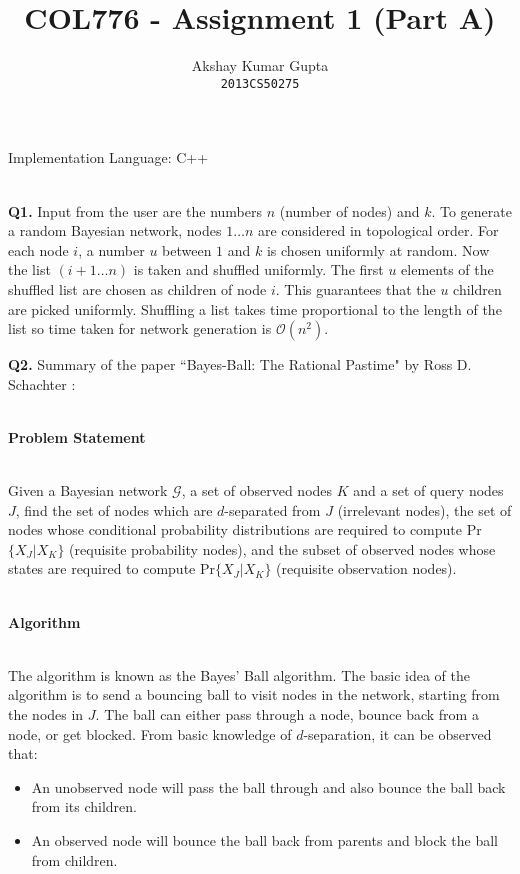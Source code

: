 \documentclass[]{article}
\begin{document}
\title{COL776 - Assignment 1 (Part A)}
\author{\Large Akshay Kumar Gupta\\ \texttt{2013CS50275}}
\date{}
\maketitle

{\noindent \large Implementation Language: C++}
\\ 
\\
\par \noindent
{{\bfseries Q1.}} Input from the user are the numbers $n$ (number of nodes) and $k$. To generate a random Bayesian network, nodes $1 \ldots n$ are considered in topological order. For each node $i$, a number $u$ between $1$ and $k$ is chosen uniformly at random. Now the list $(i+1 \ldots n)$ is taken and shuffled uniformly. The first $u$ elements of the shuffled list are chosen as children of node $i$. This guarantees that the $u$ children are picked uniformly. Shuffling a list takes time proportional to the length of the list so time taken for network generation is $\mathcal{O}(n^2)$.
\\
\par \noindent
{{\bfseries Q2.}} Summary of the paper ``Bayes-Ball: The Rational Pastime" by Ross D. Schachter : \\ \\ \centerline{\bfseries Problem Statement} \\ Given a Bayesian network $\mathcal{G}$, a set of observed nodes $K$ and a set of query nodes $J$, find the set of nodes which are $d$-separated from $J$ (irrelevant nodes), the set of nodes whose conditional probability distributions are required to compute Pr$\{X_J | X_K\}$ (requisite probability nodes), and the subset of observed nodes whose states are required to compute Pr$\{X_J | X_K\}$ (requisite observation nodes). 
\\ \\ \centerline{\bfseries Algorithm} \\ The algorithm is known as the Bayes' Ball algorithm. The basic idea of the algorithm is to send a bouncing ball to visit nodes in the network, starting from the nodes in $J$. The ball can either pass through a node, bounce back from a node, or get blocked. From basic knowledge of $d$-separation, it can be observed that:
\begin{itemize}
\item An unobserved node will pass the ball through and also bounce the ball back from its children.
\item An observed node will bounce the ball back from parents and block the ball from children.
\end{itemize}
\end{document}
